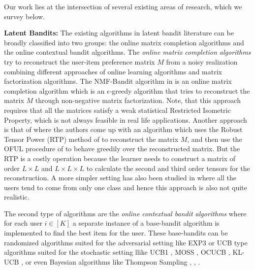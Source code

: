 Our work lies at the intersection of several existing areas of research, which we survey below. 

\textbf{Latent Bandits:} The existing algorithms in latent bandit literature can be broadly classified into two groups: the online matrix completion algorithms and the online contextual bandit  algorithms. The \textit{online matrix completion algorithms} try to reconstruct the user-item preference matrix $M$ from a noisy realization combining different approaches of online learning algorithms and matrix factorization algorithms. The NMF-Bandit algorithm in \citet{sen2016contextual} is an online matrix completion algorithm which is an $\epsilon$-greedy algorithm that tries to reconstruct the matrix $M$ through non-negative matrix factorization. Note, that this approach requires that all the matrices satisfy a weak statistical Restricted Isometric Property, which is not always feasible in real life applications. Another approach is that of \citet{gopalan2016low} where the authors come up with an algorithm which uses the Robust Tensor Power (RTP) method of \citet{anandkumar2014tensor} to reconstruct the matrix $M$, and then use the OFUL procedure of \citet{abbasi2011improved} to behave greedily over the reconstructed matrix. But the RTP is a costly operation because the learner needs to construct a matrix of order $L\times L$ and $L\times L \times L$ to calculate the second and third order tensors for the reconstruction.  A more simpler setting has also been studied in \citet{maillard2014latent} where all the users tend to come from only one class and hence this approach is also not quite realistic. 

	The second type of algorithms are the \textit{online contextual bandit algorithms} where for each user $i\in[K]$ a separate instance of a base-bandit algorithm is implemented to find the best item for the user. These base-bandits can be randomized algorithms suited for the adversarial setting like EXP3 \citep{auer2002nonstochastic} or UCB type algorithms suited for the stochastic setting llike UCB1 \citep{auer2002finite}, MOSS \citep{audibert2009minimax}, OCUCB \citep{lattimore2015optimally}, KL-UCB \citep{cappe2013kullback}, \citep{garivier2011kl} or even Bayesian algorithms like Thompson Sampling \citep{thompson1933likelihood}, \citep{thompson1935theory}, \citep{agrawal2012analysis}.

